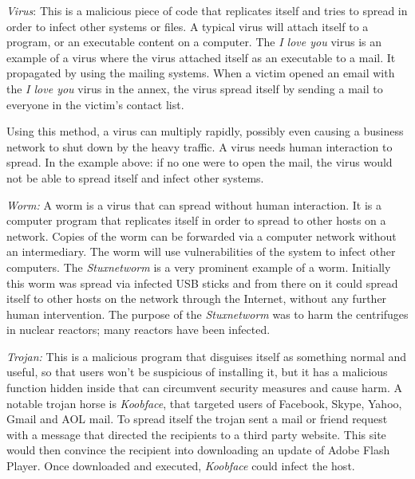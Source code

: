 % 
 
\begin{description}
\item \textit{Virus}: This is a malicious piece of code that replicates itself and tries to spread in order  to infect other systems or files. A typical virus will attach itself to a program, or an executable content on a computer. The \textit{I love you} virus is an example of a virus where the virus attached itself as an executable to a mail. It propagated by using the mailing systems. When a victim opened an email with the \textit{I love you} virus in the annex, the virus spread itself by sending a mail to everyone in the victim's contact list. 

Using this method, a virus can multiply rapidly, possibly even causing a business network to shut down by the heavy traffic. A virus needs human interaction to spread. In the example above: if no one were to open the mail, the virus would not be able to spread itself and infect other systems.

\item \textit{Worm:} A worm is a virus that can spread without human interaction. It is a computer program that replicates itself in order to spread to other hosts on a network. Copies of the worm can be forwarded via a computer network without an intermediary. The worm will use vulnerabilities of the system to infect other computers.
The \textit{Stuxnetworm} is a very prominent example of a worm. Initially this worm was spread via infected USB sticks and from there on it could spread itself to other hosts on the network through the Internet, without any further human intervention. The purpose of the \textit{Stuxnetworm} was to harm the centrifuges in nuclear reactors; many reactors have been infected.  

\item \textit{Trojan:} This is a malicious program that disguises itself as something normal and useful, so that users won't be suspicious of installing it, but it has a malicious function hidden inside that can circumvent security measures and cause harm.  A notable trojan horse is \textit{Koobface}, that targeted users of Facebook, Skype, Yahoo, Gmail and AOL mail. To spread itself the trojan sent a mail or friend request with a message that directed the recipients to a third party website. This site would then convince the recipient into downloading an update of Adobe Flash Player. Once downloaded and executed, \textit{Koobface }could infect the host.

\end{description}
